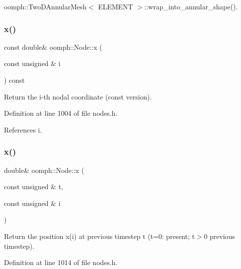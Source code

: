 oomph\+::\+Two\+D\+Annular\+Mesh$<$ E\+L\+E\+M\+E\+N\+T $>$\+::wrap\+\_\+into\+\_\+annular\+\_\+shape().

\mbox{\label{classoomph_1_1Node_aa222576ddc1a859fbbfe1f31f79cee7d}} 
\subsubsection{\texorpdfstring{x()}{x()}\hspace{0.1cm}{\footnotesize\ttfamily [2/4]}}
{\footnotesize\ttfamily const double\& oomph\+::\+Node\+::x (\begin{DoxyParamCaption}\item[{const unsigned \&}]{i }\end{DoxyParamCaption}) const\hspace{0.3cm}{\ttfamily [inline]}}



Return the i-\/th nodal coordinate (const version). 



Definition at line 1004 of file nodes.\+h.



References i.

\mbox{\label{classoomph_1_1Node_a7b8665721f9a4550ab3b027ced4b958d}} 
\subsubsection{\texorpdfstring{x()}{x()}\hspace{0.1cm}{\footnotesize\ttfamily [3/4]}}
{\footnotesize\ttfamily double\& oomph\+::\+Node\+::x (\begin{DoxyParamCaption}\item[{const unsigned \&}]{t,  }\item[{const unsigned \&}]{i }\end{DoxyParamCaption})\hspace{0.3cm}{\ttfamily [inline]}}



Return the position x(i) at previous timestep t (t=0\+: present; t$>$0 previous timestep). 



Definition at line 1014 of file nodes.\+h.



